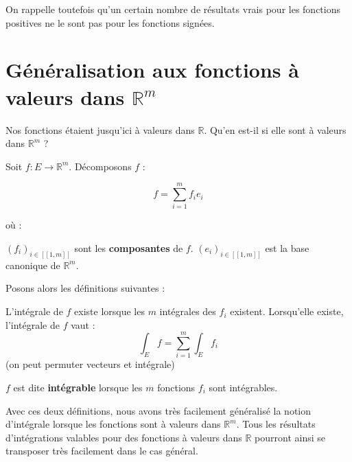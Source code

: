 \documentclass[../integ-proba.tex]{subfiles}
\begin{document}
On rappelle toutefois qu'un certain nombre de résultats vrais pour les fonctions positives ne le sont pas pour les fonctions signées.


\section{Généralisation aux fonctions à valeurs dans $\mathbb{R}^m$}

Nos fonctions étaient jusqu'ici à valeurs dans $\mathbb{R}$. Qu'en est-il si elle sont à valeurs dans $\mathbb{R}^m$ ?

Soit $f:E\longrightarrow \mathbb{R}^m$. Décomposons $f$ :

$$
f = \sum_{i=1}^{m}f_ie_i
$$

où :
\begin{itemize}
  \itemb $\left(f_i\right)_{i\in[\![1,m]\!]}$ sont les \textbf{composantes} de $f$.
  \itemb $\left(e_i\right)_{i\in[\![1,m]\!]}$ est la base canonique de $\mathbb{R}^m$.
\end{itemize}

Posons alors les définitions suivantes :

\begin{defi}
  L'intégrale de $f$ existe lorsque les $m$ intégrales des $f_i$ existent.
  Lorsqu'elle existe, l'intégrale de $f$ vaut :
  $$
  \int_Ef = \sum_{i=1}^{m}\int_Ef_i
  $$
  (on peut permuter vecteurs et intégrale)
\end{defi}

\begin{defi}
  $f$ est dite \textbf{intégrable} lorsque les $m$ fonctions $f_i$ sont intégrables.
\end{defi}

Avec ces deux définitions, nous avons très facilement généralisé la notion d'intégrale lorsque les fonctions sont à valeurs dans $\mathbb{R}^m$.
Tous les résultats d'intégrations valables pour des fonctions à valeurs dans $\mathbb{R}$ pourront ainsi se transposer très facilement dans le cas général.
\end{document}

